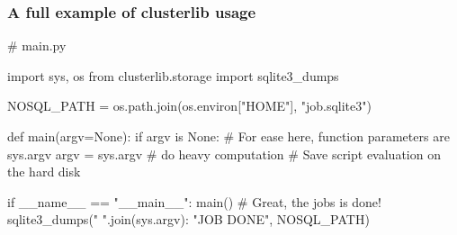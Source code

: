 \documentclass[11pt,compress,serif]{beamer}
\begin{document}
\frame[plain]
{
    \titlepage
}

%    
%    
%    

\begin{frame}[fragile=singleslide]
    \frametitle{A full example of clusterlib usage}
    

    \begin{pythoncode}
        # main.py
        
        import sys, os
        from clusterlib.storage import sqlite3_dumps
        
        NOSQL_PATH = os.path.join(os.environ["HOME"], "job.sqlite3")
        
        def main(argv=None):
        if argv is None: # For ease here, function parameters are sys.argv
        argv = sys.argv  
        # do heavy computation
        # Save script evaluation on the hard disk
        
        if __name__ == "__main__":
        main()
        # Great, the jobs is done!
        sqlite3_dumps({" ".join(sys.argv): "JOB DONE"}, NOSQL_PATH)
    \end{pythoncode}

\end{frame}
\end{document}
